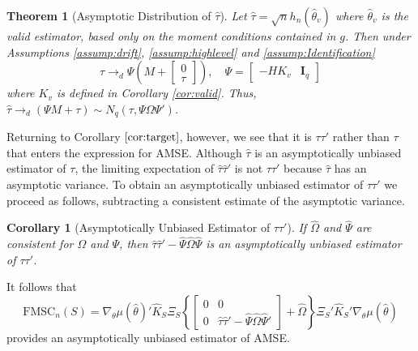 \documentclass[12pt]{article}
\newtheorem{thm}{Theorem}[section]
\newtheorem{cor}{Corollary}[section]
\theoremstyle{definition}
\begin{document}
\begin{thm}[Asymptotic Distribution of $\widehat{\tau}$] 
\label{thm:tau}
Let $\widehat{\tau} = \sqrt{n} h_n(\widehat{\theta}_v)$ where $\widehat{\theta}_v$ is the valid estimator, based only on the moment conditions contained in $g$. 
Then under Assumptions \ref{assump:drift}, \ref{assump:highlevel} and \ref{assump:Identification}
$$\widehat{\tau} \rightarrow_d \Psi\left( M + \left[\begin{array}
	{c} 0 \\ \tau
\end{array} \right]\right), \quad \Psi = \left[\begin{array}{cc} -HK_v & \mathbf{I}_q \end{array}\right]$$ 
where $K_v$ is defined in Corollary \ref{cor:valid}.
Thus, $\widehat{\tau}\rightarrow_d (\Psi M + \tau) \sim N_q(\tau, \Psi \Omega \Psi')$.
\end{thm}

Returning to Corollary $\ref{cor:target}$, however, we see that it is $\tau \tau'$ rather than $\tau$ that enters the expression for AMSE. 
Although $\widehat{\tau}$ is an asymptotically unbiased estimator of $\tau$, the limiting expectation of $\widehat{\tau} \widehat{\tau}'$ is not $\tau\tau'$ because $\widehat{\tau}$ has an asymptotic variance.  
To obtain an asymptotically unbiased estimator of $\tau\tau'$ we proceed as follows, subtracting a consistent estimate of the asymptotic variance.


\begin{cor}[Asymptotically Unbiased Estimator of $\tau \tau'$]
\label{cor:tautau}
If $\widehat{\Omega}$ and $\widehat{\Psi}$ are consistent for $\Omega$ and $\Psi$, then $ \widehat{\tau}\widehat{\tau}' - \widehat{\Psi}\widehat{\Omega}\widehat{\Psi}$ is an asymptotically unbiased estimator of $\tau\tau'$.
\end{cor}
It follows that
\begin{equation}
\label{eq:fmsc}
	\mbox{FMSC}_n(S) = \nabla_\theta\mu(\widehat{\theta})'\widehat{K}_S\Xi_S \left\{\left[\begin{array}{cc}0&0\\0&\widehat{\tau}\widehat{\tau}' - \widehat{\Psi}\widehat{\Omega}\widehat{\Psi}'\end{array}\right] + \widehat{\Omega}\right\}\Xi_S'\widehat{K}_S' \nabla_\theta\mu(\widehat{\theta})
\end{equation}
provides an asymptotically unbiased estimator of AMSE.
\end{document}
